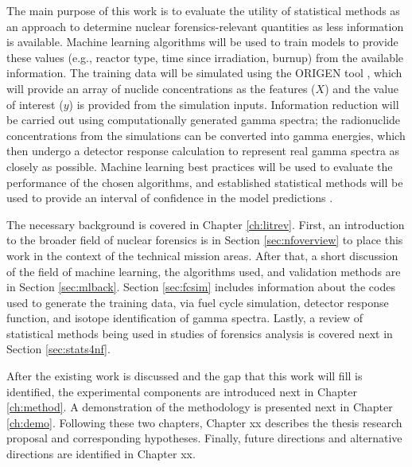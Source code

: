 The main purpose of this work is to evaluate the utility of statistical methods
as an approach to determine nuclear forensics-relevant quantities as less
information is available. Machine learning algorithms will be used to train
models to provide these values (e.g., reactor type, time since irradiation,
burnup) from the available information. The training data will be simulated
using the ORIGEN tool , which will provide an array of nuclide
concentrations as the features ($X$) and the value of interest ($y$) is
provided from the simulation inputs.  Information reduction will be carried out
using computationally generated gamma spectra; the radionuclide concentrations
from the simulations can be converted into gamma energies, which then undergo a
detector response calculation to represent real gamma spectra as closely as
possible. Machine learning best practices will be used to evaluate the
performance of the chosen algorithms, and established statistical methods will
be used to provide an interval of confidence in the model predictions
.

The necessary background is covered in Chapter \ref{ch:litrev}.  First, an
introduction to the broader field of nuclear forensics is in Section
\ref{sec:nfoverview} to place this work in the context of the technical mission
areas. After that, a short discussion of the field of machine learning, the
algorithms used, and validation methods are in Section \ref{sec:mlback}.
Section \ref{sec:fcsim} includes information about the codes used to generate
the training data, via fuel cycle simulation, detector response function, and
isotope identification of gamma spectra.  Lastly, a review of statistical
methods being used in studies of forensics analysis is covered next in Section
\ref{sec:stats4nf}. 


After the existing work is discussed and the gap that this work will fill is
identified, the experimental components are introduced next in Chapter
\ref{ch:method}. A demonstration of the methodology is presented next in Chapter
\ref{ch:demo}. Following these two chapters, Chapter xx %
describes the thesis research proposal and corresponding hypotheses. 
Finally, future directions and alternative directions are identified in 
Chapter xx. %
